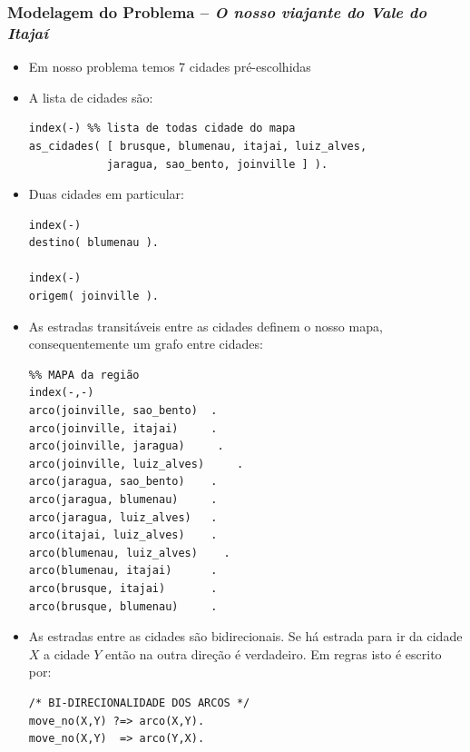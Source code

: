 \begin{frame}[fragile, allowframebreaks=0.9]

\frametitle{Modelagem do Problema -- \textit{O nosso viajante do Vale do Itajaí}}

\begin{itemize}
  \item Em nosso problema temos 7 cidades pré-escolhidas

  \item A lista de cidades são:
\begin{footnotesize}
 \begin{verbatim}
index(-) %% lista de todas cidade do mapa
as_cidades( [ brusque, blumenau, itajai, luiz_alves,
            jaragua, sao_bento, joinville ] ).
\end{verbatim}
 \end{footnotesize}

\item  Duas cidades em particular:
\begin{footnotesize}
\begin{verbatim}
index(-)
destino( blumenau ).

index(-)
origem( joinville ).
\end{verbatim}  
\end{footnotesize}
  
\item As estradas transitáveis entre as cidades definem
  o nosso mapa, consequentemente um grafo entre
  cidades:
\begin{footnotesize}
\begin{verbatim}
%% MAPA da região
index(-,-)
arco(joinville, sao_bento)  .
arco(joinville, itajai)     .
arco(joinville, jaragua)     .
arco(joinville, luiz_alves)     .
arco(jaragua, sao_bento)    .
arco(jaragua, blumenau)     .
arco(jaragua, luiz_alves)   .
arco(itajai, luiz_alves)    . 
arco(blumenau, luiz_alves)    . 
arco(blumenau, itajai)      .
arco(brusque, itajai)       .
arco(brusque, blumenau)     .
\end{verbatim} 
\end{footnotesize}  

\item As estradas entre as cidades são bidirecionais. Se  há estrada para ir
da cidade $X$ a cidade $Y$ então na outra direção é verdadeiro.
Em regras isto é escrito por:
\begin{footnotesize}
\begin{verbatim}
/* BI-DIRECIONALIDADE DOS ARCOS */
move_no(X,Y) ?=> arco(X,Y).
move_no(X,Y)  => arco(Y,X).
\end{verbatim} 
\end{footnotesize}  


\end{itemize}
\end{frame}
